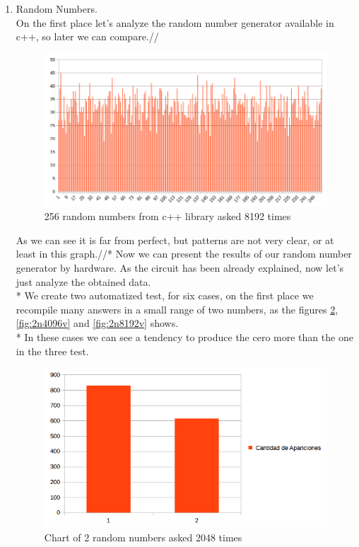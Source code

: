 \documentclass[twocolumn]{IEEEtran}
\begin{document}
\begin{enumerate}
	\item Random Numbers.\\
    On the first place let's analyze the random number generator available in c++, so later we can compare.//
    
    \begin{figure}[h!]
    \centering
    \includegraphics[width=\columnwidth]{src/RANDOMc++.png}
	\caption{256 random numbers from c++ library asked 8192 times}
    \label{fig:2n2048vc++}
    \end{figure}
    As we can see it is far from perfect, but patterns are not very clear, or at least in this graph.//*    
    Now we can present the results of our random number generator by hardware. As the circuit has been already explained, now let's just analyze the obtained data. \\*
    We create two automatized test, for six cases, on the first place we recompile many answers in a small range of two numbers, as the figures \ref{fig:2n2048v}, \ref{fig:2n4096v} and \ref{fig:2n8192v} shows.  \\* 
In these cases we can see a tendency to produce the cero more than the one in the three test.\\
	\begin{figure}[h!]
    \centering
    \includegraphics[width=\columnwidth]{src/2n2048v.png}
	\caption{Chart of 2 random numbers asked 2048 times}
    \label{fig:2n2048v}
    \end{figure}
    

\end{enumerate}
\end{document}
